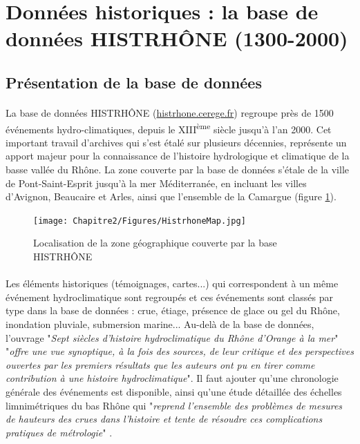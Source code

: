 \FloatBarrier

\section{Données historiques : la base de données HISTRHÔNE (1300-2000)}
\label{sec:HISTRHONE}
	\subsection{Présentation de la base de données}

	\paragraph{} La base de données HISTRHÔNE (\url{histrhone.cerege.fr}) \citep{pichard_sept_2014} regroupe près de 1500 événements hydro-climatiques, depuis le XIII\textsuperscript{ème} siècle jusqu'à l'an 2000. Cet important travail d'archives qui s'est étalé sur plusieurs décennies, représente un apport majeur pour la connaissance de l'histoire hydrologique et climatique de la basse vallée du Rhône. La zone couverte par la base de données s'étale de la ville de Pont-Saint-Esprit jusqu'à la mer Méditerranée, en incluant les villes d'Avignon, Beaucaire et Arles, ainsi que l'ensemble de la Camargue (figure \ref{fig:MapHistrhone}). 
	
	\begin{figure}[h]
	\centering
		\texttt{[image: Chapitre2/Figures/HistrhoneMap.jpg]}
        \caption{Localisation de la zone géographique couverte par la base HISTRHÔNE \citep{pichard_sept_2014} }
		\label{fig:MapHistrhone}
	\end{figure}
	
	\paragraph{} Les éléments historiques (témoignages, cartes...) qui correspondent à un même événement hydroclimatique sont regroupés et ces événements sont classés par type dans la base de données : crue, étiage, présence de glace ou gel du Rhône, inondation pluviale, submersion marine... Au-delà de la base de données, l'ouvrage "\textit{Sept siècles d'histoire hydroclimatique du Rhône d'Orange à la mer}" \citep{pichard_sept_2014} "\textit{offre une vue synoptique, à la fois des sources, de leur critique et des perspectives ouvertes par les premiers résultats que les auteurs ont pu en tirer comme contribution à une histoire hydroclimatique}". Il faut ajouter qu'une chronologie générale des événements est disponible, ainsi qu'une étude détaillée des échelles limnimétriques du bas Rhône qui "\textit{reprend l'ensemble des problèmes de mesures de hauteurs des crues dans l'histoire et tente de résoudre ces complications pratiques de métrologie}" \citep{pichard_hauteurs_2013} .
	
